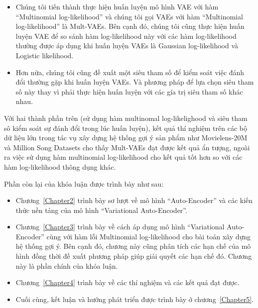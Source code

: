 \begin{itemize}
    \item Chúng tôi tiến thành thực hiện huấn luyện mô hình VAE với hàm ``Multinomial log-likelihood'' và chúng tôi gọi VAEs với hàm ``Multinomial log-likelihood'' là Mult-VAEs. Bên cạnh đó, chúng tôi cũng thực hiện huấn luyện VAE để so sánh hàm log-likelihood này với các hàm log-likelihood thường được áp dụng khi huấn luyện VAEs là Gaussian log-likelihood và Logistic likelihood.
    \item Hơn nữa, chúng tôi cũng đề xuất một siêu tham số để kiểm soát việc đánh đổi thường gặp khi huấn luyện VAEs. Và phương pháp để lựa chọn siêu tham số này thay vì phải thực hiện huấn luyện với các gía trị siêu tham số khác nhau.
\end{itemize}

Với hai thành phần trên (sử dụng hàm multinomal log-likelighood và siêu tham sô kiểm soát sự đánh đổi trong lúc huấn luyện), kết quả thí nghiệm trên các bộ dữ liệu lớn trong tác vụ xây dựng hệ thống gợi ý sản phẩm như Movielens-20M và Million Song Datasets cho thấy Mult-VAEs đạt được kết quả ẩn tượng, ngoài ra việc sử dụng hàm multinomial log-likelihood cho kết quả tốt hơn so với các hàm log-likelihood thông dụng khác.

Phần còn lại của khóa luận được trình bày như sau:
\begin{itemize}
    \item Chương~\ref{Chapter2} trình bày sơ lượt về mô hình ``Auto-Encoder'' và các kiến thức nền tảng của mô hình ``Variational Auto-Encoder''.
    \item Chương~\ref{Chapter3} trình bày về cách áp dụng mô hình ``Variational Auto-Encoder'' cùng với hàm lỗi Multinomial log-likelihood cho bài toán xây dựng hệ thống gợi ý. Bên cạnh đó, chương này cũng phân tích các hạn chế của mô hình đồng thời đề xuất phương pháp giúp giải quyết các hạn chế đó. Chương này là phần chính của khóa luận.
    \item Chương~\ref{Chapter4} trình bày về các thí nghiệm và các kết quả đạt được.
    \item Cuối cùng, kết luận và hướng phát triển được trình bày ở chương~\ref{Chapter5}.
\end{itemize}

